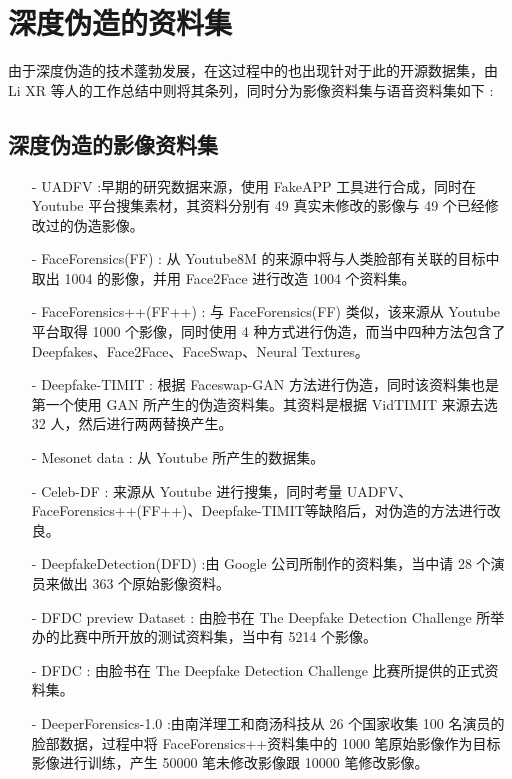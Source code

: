 \chapter{深度伪造的资料集}
\label{chap:2}

由于深度伪造的技术蓬勃发展，在这过程中的也出现针对于此的开源数据集，由 Li XR 等人的工作总结中则将其条列，同时分为影像资料集与语音资料集如下 :

\section{深度伪造的影像资料集}

\begin{itemize}
\item [-] UADFV \cite{matern2019exploiting}:早期的研究数据来源，使用 FakeAPP \cite{list1141} 工具进行合成，同时在 Youtube 平台搜集素材，其资料分别有 49 真实未修改的影像与 49 个已经修改过的伪造影像。

\item [-] FaceForensics(FF) \cite{rossler2018faceforensics}: 从 Youtube8M \cite{abu2016youtube} 的来源中将与人类脸部有关联的目标中取出 1004 的影像，并用 Face2Face 进行改造 1004 个资料集。

\item [-] FaceForensics++(FF++) \cite{rossler2019faceforensics++}: 与 FaceForensics(FF) 类似，该来源从 Youtube 平台取得 1000 个影像，同时使用 4 种方式进行伪造，而当中四种方法包含了 Deepfakes、Face2Face、FaceSwap、Neural Textures。

\item [-] Deepfake-TIMIT \cite{korshunov2018deepfakes}: 根据 Faceswap-GAN 方法进行伪造，同时该资料集也是第一个使用 GAN 所产生的伪造资料集。其资料是根据 VidTIMIT 来源去选 32 人，然后进行两两替换产生。

\item [-]Mesonet data \cite{afchar2018mesonet}: 从 Youtube 所产生的数据集。

\item [-]Celeb-DF \cite{li2019celeb}: 来源从 Youtube 进行搜集，同时考量 UADFV、FaceForensics++(FF++)、Deepfake-TIMIT等缺陷后，对伪造的方法进行改良。

\item [-] DeepfakeDetection(DFD) \cite{list1067}:由 Google 公司所制作的资料集，当中请 28 个演员来做出 363 个原始影像资料。

\item [-] DFDC preview Dataset \cite{dolhansky2019deepfake}: 由脸书在 The Deepfake Detection Challenge 所举办的比赛中所开放的测试资料集，当中有 5214 个影像。

\item [-] DFDC \cite{list1069}: 由脸书在 The Deepfake Detection Challenge 比赛所提供的正式资料集。

\item [-] DeeperForensics-1.0 \cite{jiang2020deeperforensics}:由南洋理工和商汤科技从 26 个国家收集 100 名演员的脸部数据，过程中将 FaceForensics++资料集中的 1000 笔原始影像作为目标影像进行训练，产生 50000 笔未修改影像跟 10000 笔修改影像。
\end{itemize}

